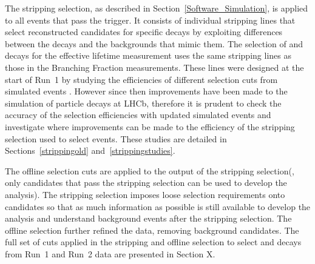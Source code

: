 The stripping selection, as described in Section~\ref{Software_Simulation}, is applied to all events that pass the trigger. It consists of individual stripping lines that select reconstructed candidates for specific decays by exploiting differences between the decays and the backgrounds that mimic them. The selection of \bsmumu and \bhh decays for the \bsmumu effective lifetime measurement uses the same stripping lines as those in the \bmumu Branching Fraction measurements. These lines were designed at the start of Run~1 by studying the efficiencies of different selection cuts from simulated events \cite{}. However since then improvements have been made to the simulation of particle decays at LHCb, therefore it is prudent to check the accuracy of the selection efficiencies with updated simulated events and investigate where improvements can be made to the efficiency of the stripping selection used to select \bsmumu events. These studies are detailed in Sections~\ref{strippingold} and~\ref{strippingstudies}.

The offline selection cuts are applied to the output of the stripping selection(, only candidates that pass the stripping selection can be used to develop the analysis). The stripping selection imposes loose selection requirements onto \bsmumu candidates so that as much information as possible is still available to develop the analysis and understand background events after the stripping selection. The offline selection further refined the data, removing background candidates. The full set of cuts applied in the stripping and offline selection to select \bsmumu and \bhh decays from Run~1 and Run~2 data are presented in Section X. 


 



